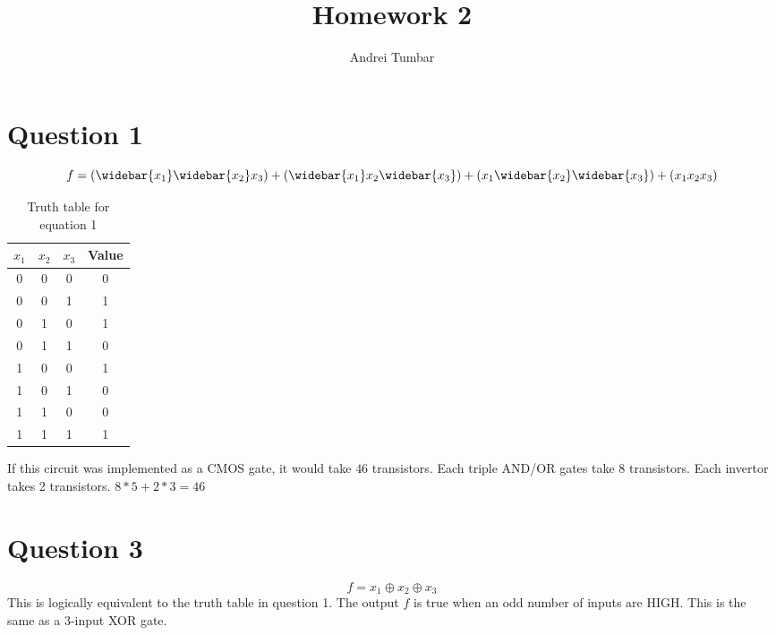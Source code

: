 \documentclass[11pt]{article}
\title{\textbf{Homework 2}}
\author{Andrei Tumbar}
\date{}
\newcommand*\xor{\oplus}
\begin{document}
\maketitle
\thispagestyle{empty}

\section*{Question 1}
\begin{equation}
f = (\widebar{x_1}\widebar{x_2}x_3) + (\widebar{x_1}x_2\widebar{x_3}) + (x_1\widebar{x_2}\widebar{x_3}) + (x_1x_2x_3)
\end{equation}

\begin{table}[h]
\renewcommand{\arraystretch}{1.2}
\setlength{\tabcolsep}{12pt}
\caption{Truth table for equation 1}
\begin{center}
\begin{tabular}{|c|c|c||c|}\hline
$x_1$ & $x_2$ & $x_3$ & Value\\\hline
0 & 0 & 0 & 0 \\\hline
0 & 0 & 1 & 1 \\\hline
0 & 1 & 0 & 1 \\\hline
0 & 1 & 1 & 0 \\\hline
1 & 0 & 0 & 1 \\\hline
1 & 0 & 1 & 0 \\\hline
1 & 1 & 0 & 0 \\\hline
1 & 1 & 1 & 1 \\\hline
\end{tabular}
\end{center}
\label{tab:TRUTH}
\end{table}

If this circuit was implemented as a CMOS gate, it would take $46$ transistors.
Each triple AND/OR gates take 8 transistors. Each invertor takes 2 transistors.
$8*5 + 2*3 = 46$ 
 
\section*{Question 3}
\begin{equation}
f = x_1 \xor x_2 \xor x_3
\end{equation}
This is logically equivalent to the truth table in question 1. The output $f$ is 
true when an odd number of inputs are HIGH. This is the same as a 3-input XOR gate.

\pagebreak

\end{document}
